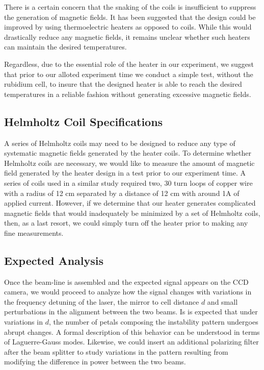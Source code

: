 \documentclass[aps,twocolumn,secnumarabic,balancelastpage,amsmath,amssymb,nofootinbib]{revtex4}
\begin{document}
There is a certain concern that the snaking of the coils is insufficient to suppress the generation of magnetic fields. It has been suggested that the design could be improved by using thermoelectric heaters as opposed to coils. While this would drastically reduce any magnetic fields, it remains unclear whether such heaters can maintain the desired temperatures.

Regardless, due to the essential role of the heater in our experiment, we suggest that prior to our alloted experiment time we conduct a simple test, without the rubidium cell, to insure that the designed heater is able to reach the desired temperatures in a reliable fashion without generating excessive magnetic fields.

\subsection*{Helmholtz Coil Specifications}

A series of Helmholtz coils may need to be designed to reduce any type of systematic magnetic fields generated by the heater coils. To determine whether Helmholtz coils are necessary, we would like to measure the amount of magnetic field generated by the heater design in a test prior to our experiment time. A series of coils used in a similar study required two, 30 turn loops of copper wire with a radius of 12 cm separated by a distance of 12 cm with around 1A of applied current\cite{sclark04}. However, if we determine that our heater generates complicated magnetic fields that would inadequately be minimized by a set of Helmholtz coils, then, as a last resort, we could simply turn off the heater prior to making any fine measurements. 

\subsection*{Expected Analysis}
Once the beam-line is assembled and the expected signal appears on the CCD camera, we would proceed to analyze how the signal changes with variations in the frequency detuning of the laser, the mirror to cell distance $d$ and small perturbations in the alignment between the two beams. Is is expected that under variations in $d$, the number of petals composing the instability pattern undergoes abrupt changes\cite{grynberg93}. A formal description of this behavior can be understood in terms of Laguerre-Gauss modes. Likewise, we could insert an additional polarizing filter after the beam splitter to study variations in the pattern resulting from modifying the difference in power between the two beams.    
\end{document}
